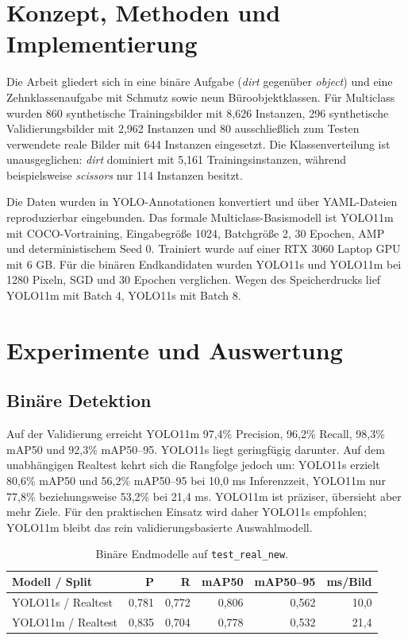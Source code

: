 \documentclass[conference,a4paper]{IEEEtran}
\begin{document}
\section{Konzept, Methoden und Implementierung}
Die Arbeit gliedert sich in eine binäre Aufgabe (\emph{dirt} gegenüber \emph{object}) und eine Zehnklassenaufgabe mit Schmutz sowie neun Büroobjektklassen. Für Multiclass wurden 860 synthetische Trainingsbilder mit 8,626 Instanzen, 296 synthetische Validierungsbilder mit 2,962 Instanzen und 80 ausschließlich zum Testen verwendete reale Bilder mit 644 Instanzen eingesetzt. Die Klassenverteilung ist unausgeglichen: \emph{dirt} dominiert mit 5,161 Trainingsinstanzen, während beispielsweise \emph{scissors} nur 114 Instanzen besitzt.

Die Daten wurden in YOLO-Annotationen konvertiert und über YAML-Dateien reproduzierbar eingebunden. Das formale Multiclass-Basismodell ist YOLO11m mit COCO-Vortraining, Eingabegröße 1024, Batchgröße 2, 30 Epochen, AMP und deterministischem Seed 0. Trainiert wurde auf einer RTX 3060 Laptop GPU mit 6 GB. Für die binären Endkandidaten wurden YOLO11s und YOLO11m bei 1280 Pixeln, SGD und 30 Epochen verglichen. Wegen des Speicherdrucks lief YOLO11m mit Batch 4, YOLO11s mit Batch 8.

\section{Experimente und Auswertung}
\subsection{Binäre Detektion}
Auf der Validierung erreicht YOLO11m 97,4\% Precision, 96,2\% Recall, 98,3\% mAP50 und 92,3\% mAP50--95. YOLO11s liegt geringfügig darunter. Auf dem unabhängigen Realtest kehrt sich die Rangfolge jedoch um: YOLO11s erzielt 80,6\% mAP50 und 56,2\% mAP50--95 bei 10,0 ms Inferenzzeit, YOLO11m nur 77,8\% beziehungsweise 53,2\% bei 21,4 ms. YOLO11m ist präziser, übersieht aber mehr Ziele. Für den praktischen Einsatz wird daher YOLO11s empfohlen; YOLO11m bleibt das rein validierungsbasierte Auswahlmodell.

\begin{table}[h]
\centering\small
\begin{tabular}{lrrrrr}\toprule
Modell / Split & P & R & mAP50 & mAP50--95 & ms/Bild\\\midrule
YOLO11s / Realtest & 0,781 & 0,772 & 0,806 & 0,562 & 10,0\\
YOLO11m / Realtest & 0,835 & 0,704 & 0,778 & 0,532 & 21,4\\\bottomrule
\end{tabular}
\caption{Binäre Endmodelle auf \texttt{test\_real\_new}.}
\end{table}
\end{document}
